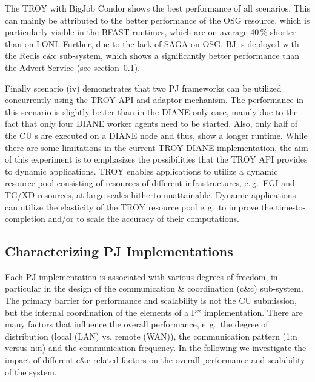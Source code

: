 \documentclass[conference,final]{IEEEtran}
\newcommand{\jhanote}[1]{ {\textcolor{red} { ***shantenu: #1 }}}
\newcommand{\alnote}[1]{ {\textcolor{blue} { ***andre: #1 }}}
\newcommand{\alnote}[1]{}
\newcommand{\jhanote}[1]{}
\newcommand{\cu}{CU\xspace}
\newcommand{\upp}{\vspace*{-0.5em}}
\begin{document}
The TROY with BigJob Condor shows the best performance of all scenarios. This
can mainly be attributed to the better performance of the OSG resource, which is
particularly visible in the BFAST runtimes, which are on average 40\,\% shorter
than on LONI. Further, due to the lack of SAGA on OSG, BJ is deployed with the
Redis c\&c sub-system, which shows a significantly better performance than the
Advert Service (see section~\ref{sec:pj_performance}).


Finally scenario (iv) demonstrates that two PJ frameworks can be
utilized concurrently using the TROY API and adaptor mechanism. The
performance in this scenario is slightly better than in the DIANE only
case, mainly due to the fact that only four DIANE worker agents need
to be started. Also, only half of the \cu s are executed on a DIANE node
and thus, show a longer runtime. While there are some limitations in
the current TROY-DIANE implementation, the aim of this experiment is
to emphasizes the possibilities that the TROY API provides to dynamic
applications. TROY enables applications to utilize a dynamic resource
pool consisting of resources of different infrastructures, e.\,g.\ EGI
and TG/XD resources, at large-scales hitherto unattainable. Dynamic
applications can utilize the elasticity of the TROY resource pool
e.\,g.\ to improve the time-to-completion and/or to scale the accuracy
of their computations.


\subsection{Characterizing PJ Implementations\upp\upp}
\label{sec:pj_performance}
Each PJ implementation is associated with various degrees of freedom,
in particular in the design of the communication \& coordination
(c\&c) sub-system.  The primary barrier for performance and
scalability is not the \cu  submission, but the internal coordination of
the elements of a P* implementation. There are many factors that
influence the overall performance, e.\,g.\ the degree of distribution
(local (LAN) vs. remote (WAN)), the communication pattern (1:n versus
n:n) and the communication frequency. In the following we investigate
the impact of different c\&c related factors on the overall
performance and scalability of the system.
\end{document}
